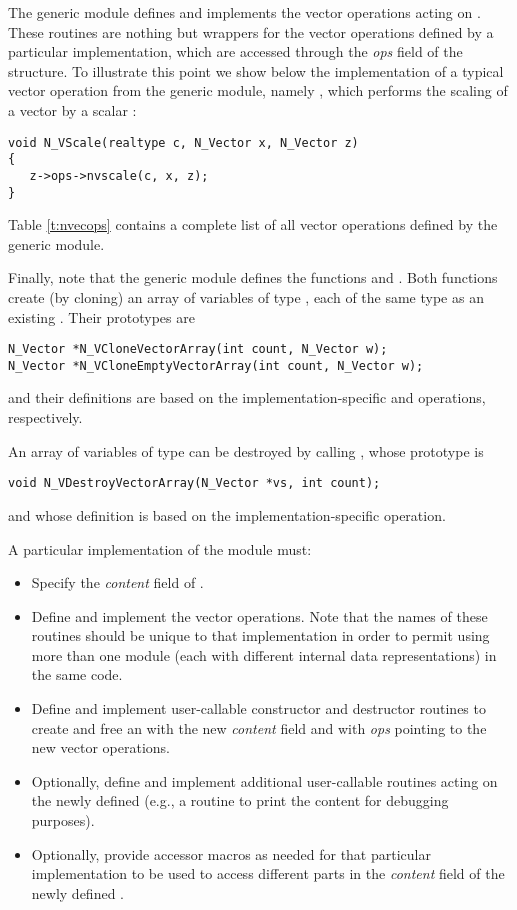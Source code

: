 The generic {\nvector} module defines and implements the vector operations 
acting on .
These routines are nothing but wrappers for the vector operations defined by
a particular {\nvector} implementation, which are accessed through the {\em ops}
field of the  structure. To illustrate this point we
show below the implementation of a typical vector operation from the
generic {\nvector} module, namely , which performs the scaling of a
vector  by a scalar :
\begin{verbatim}
void N_VScale(realtype c, N_Vector x, N_Vector z) 
{
   z->ops->nvscale(c, x, z);
}
\end{verbatim}
Table \ref{t:nvecops} contains a complete list of all vector operations defined
by the generic {\nvector} module.

Finally, note that the generic {\nvector} module defines the functions
 and .  Both functions
create (by cloning) an array of  variables of type , each
of the same type as an existing . Their prototypes are
\begin{verbatim}
N_Vector *N_VCloneVectorArray(int count, N_Vector w);
N_Vector *N_VCloneEmptyVectorArray(int count, N_Vector w);
\end{verbatim}
and their definitions are based on the implementation-specific  and
 operations, respectively.

An array of variables of type  can be destroyed by
calling , whose prototype is
\begin{verbatim}
void N_VDestroyVectorArray(N_Vector *vs, int count);
\end{verbatim}
and whose definition is based on the implementation-specific  operation.


A particular implementation of the {\nvector} module must:
\begin{itemize}
\item Specify the {\em content} field of .
\item Define and implement the vector operations. 
  Note that the names of these routines should be unique to that implementation in order 
  to permit using more than one {\nvector} module (each with different  
  internal data representations) in the same code.
\item Define and implement user-callable constructor and destructor
  routines to create and free an  with
  the new {\em content} field and with {\em ops} pointing to the
  new vector operations.
\item Optionally, define and implement additional user-callable routines
  acting on the newly defined  (e.g., a routine to print
  the content for debugging purposes).
\item Optionally, provide accessor macros as needed for that particular implementation to 
  be used to access different parts in the {\em content} field of the newly defined .
\end{itemize}



